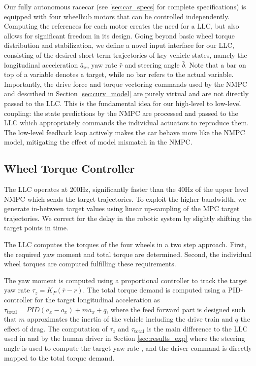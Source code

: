 \newcommand*\target[1]{\bar{#1}}

Our fully autonomous racecar (see \cref{sec:car_specs} for complete specifications) is equipped with four wheelhub motors that can be controlled independently. Computing the references for each motor creates the need for a LLC, but also allows for significant freedom in its design.
Going beyond basic wheel torque distribution and stabilization\cite{Kabzan2019_AMZ, roborace_llc}, we define a novel input interface for our LLC, consisting of the desired short-term trajectories of key vehicle states, namely the longitudinal acceleration $\bar{a}_x$, yaw rate $\bar r$ and steering angle $\bar \delta$.
Note that a bar on top of a variable denotes a target, while no bar refers to the actual variable.
Importantly, the drive force and torque vectoring commands used by the NMPC and described in Section \ref{sec:curv_model} are purely virtual and are not directly passed to the LLC.
This is the fundamental idea for our high-level to low-level coupling: the state predictions by the NMPC are processed and passed to the LLC which appropriately commands the individual actuators to reproduce them.
The low-level feedback loop actively makes the car behave more like the NMPC model, mitigating the effect of model mismatch in the NMPC.

\subsection{Wheel Torque Controller}

The LLC operates at 200Hz, significantly faster than the 40Hz of the upper level NMPC which sends the target trajectories. To exploit the higher bandwidth, we generate in-between target values using linear up-sampling of the MPC target trajectories. We correct for the delay in the robotic system by slightly shifting the target points in time. 

The LLC computes the torques of the four wheels in a two step approach. First, the required yaw moment and total torque are determined. Second, the individual wheel torques are computed fulfilling these requirements.

The yaw moment is computed using a proportional controller to track the target yaw rate $\tau_{z} = K_P (\target{r}-r)$. The total torque demand is computed using a PID-controller for the target longitudinal acceleration as $\tau_{\text{total}} = PID(\target{a}_x-a_x) + m \target{a}_x + q$, where the feed forward part is designed such that $m$ approximates the inertia of the vehicle including the drive train and $q$ the effect of drag. The computation of $\tau_{z}$ and $\tau_{\text{total}}$ is the main difference to the LLC used in \cite{vazquez2020optimization} and by the human driver in Section \ref{sec:results_exp} where the steering angle is used to compute the target yaw rate \cite{milliken}, and the driver command is directly mapped to the total torque demand.

